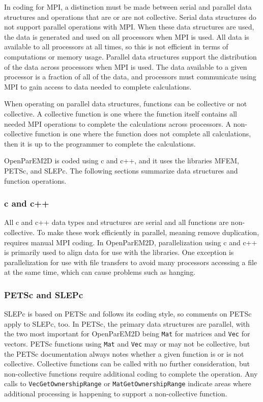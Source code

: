 \documentclass[titlepage]{article}
\renewcommand\_{\textunderscore\linebreak[1]}
\begin{document}
In coding for MPI, a distinction must be made between serial and parallel data structures and operations that are or are not collective.  Serial data structures do not support parallel operations with MPI.  When these data structures are used, the data is generated and used on all processors when MPI is used. All data is available to all processors at all times, so this is not efficient in terms of computations or memory usage.  Parallel data structures support the distribution of the data across processors when MPI is used.  The data available to a given processor is a fraction of all of the data, and processors must communicate using MPI to gain access to data needed to complete calculations.

When operating on parallel data structures, functions can be collective or not collective.  A collective function is one where the function itself contains all needed MPI operations to complete the calculations across processors.  A non-collective function is one where the function does not complete all calculations, then it is up to the programmer to complete the calculations.

OpenParEM2D is coded using c and c++, and it uses the libraries MFEM, PETSc, and SLEPc.  The following sections summarize data structures and function operations.

\subsubsection{c and c++}

All c and c++ data types and structures are serial and all functions are non-collective.  To make these work efficiently in parallel, meaning remove duplication, requires manual MPI coding.  In OpenParEM2D, parallelization using c and c++ is primarily used to align data for use with the libraries.  One exception is parallelization for use with file transfers to avoid many processors accessing a file at the same time, which can cause problems such as hanging.

\subsubsection{PETSc and SLEPc}

SLEPc is based on PETSc and follows its coding style, so comments on PETSc apply to SLEPc, too.  In PETSc, the primary data structures are parallel, with the two most important for OpenParEM2D being \texttt{Mat} for matrices and \texttt{Vec} for vectors.  PETSc functions using \texttt{Mat} and \texttt{Vec} may or may not be collective, but the PETSc documentation always notes whether a given function is or is not collective.  Collective functions can be called with no further consideration, but non-collective functions require additional coding to complete the operation.  Any calls to \texttt{VecGetOwnershipRange} or \texttt{MatGetOwnershipRange} indicate areas where additional processing is happening to support a non-collective function.
\end{document}
